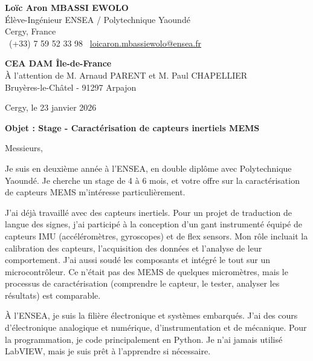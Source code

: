 \documentclass[a4paper,11pt]{article}
\begin{document}
\noindent
\textbf{Loïc Aron MBASSI EWOLO} \\
Élève-Ingénieur ENSEA / Polytechnique Yaoundé \\
Cergy, France \\
\faPhone\ (+33) 7 59 52 33 98 \quad \faEnvelope\ \href{mailto:loicaron.mbassiewolo@ensea.fr}{loicaron.mbassiewolo@ensea.fr}

\vspace{0.6cm}

\noindent
\textbf{CEA DAM Île-de-France} \\
À l'attention de M. Arnaud PARENT et M. Paul CHAPELLIER \\
Bruyères-le-Châtel - 91297 Arpajon

\hfill Cergy, le 23 janvier 2026

\vspace{0.5cm}

\noindent\textbf{Objet : Stage - Caractérisation de capteurs inertiels MEMS}

\vspace{0.4cm}

Messieurs,

\vspace{0.3cm}

Je suis en deuxième année à l'ENSEA, en double diplôme avec Polytechnique Yaoundé. Je cherche un stage de 4 à 6 mois, et votre offre sur la caractérisation de capteurs MEMS m'intéresse particulièrement.

\vspace{0.25cm}

J'ai déjà travaillé avec des capteurs inertiels. Pour un projet de traduction de langue des signes, j'ai participé à la conception d'un gant instrumenté équipé de capteurs IMU (accéléromètres, gyroscopes) et de flex sensors. Mon rôle incluait la calibration des capteurs, l'acquisition des données et l'analyse de leur comportement. J'ai aussi soudé les composants et intégré le tout sur un microcontrôleur. Ce n'était pas des MEMS de quelques micromètres, mais le processus de caractérisation (comprendre le capteur, le tester, analyser les résultats) est comparable.

\vspace{0.25cm}

À l'ENSEA, je suis la filière électronique et systèmes embarqués. J'ai des cours d'électronique analogique et numérique, d'instrumentation et de mécanique. Pour la programmation, je code principalement en Python. Je n'ai jamais utilisé LabVIEW, mais je suis prêt à l'apprendre si nécessaire.
\end{document}
